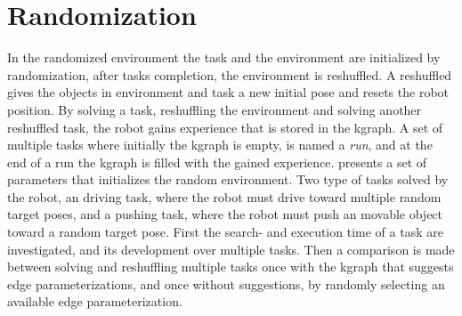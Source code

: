 %
%
%
%

\section{Randomization}%
\label{sec:randomization}
In the randomized environment the task and the environment are initialized by randomization, after tasks completion, the environment is reshuffled. A reshuffled gives the objects in environment and task a new initial pose and resets the robot position. By solving a task, reshuffling the environment and solving another reshuffled task, the robot gains experience that is stored in the \ac{kgraph}. A set of multiple tasks where initially the \ac{kgraph} is empty, is named a \textit{run}, and at the end of a run the \ac{kgraph} is filled with the gained experience.  presents a set of parameters that initializes the random environment. Two type of tasks solved by the robot, an driving task, where the robot must drive toward multiple random target poses, and a pushing task, where the robot must push an movable object toward a random target pose. First the search- and execution time of a task are investigated, and its development over multiple tasks. Then a comparison is made between solving and reshuffling multiple tasks once with the \ac{kgraph} that suggests edge parameterizations, and once without suggestions, by randomly selecting an available edge parameterization.\bs


